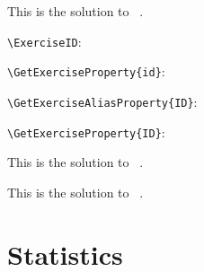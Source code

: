 \documentclass{article}
\begin{document}
\begin{problem}[points=1]
  \lipsum[3]
\end{problem}
\begin{answer}
  This is the solution to \ExerciseType\ .
\end{answer}

\begin{question}[ID=test]
  \lipsum[5]

  \verb+\ExerciseID+: 
  
  \verb+\GetExerciseProperty{id}+: 
  
  \verb+\GetExerciseAliasProperty{ID}+: 
  
  \verb+\GetExerciseProperty{ID}+: 
\end{question}
\begin{solution}
  This is the solution to \ExerciseType\ .
\end{solution}

\begin{question}[print=false,use=false]
  \lipsum[5]
\end{question}
\begin{solution}
  This is the solution to \ExerciseType\ .
\end{solution}


\printsolutions*

\section{Statistics}


\bigskip

\end{document}
